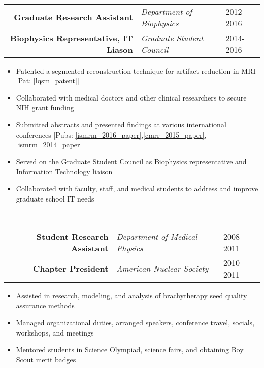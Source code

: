 \\

\begin{minipage}{\textwidth}
	\begin{center}
		\begin{tabular}{rll}
			\textbf{Graduate Research Assistant} & \textit{Department of Biophysics} & 2012-2016 \\
			\textbf{Biophysics Representative, IT Liason} & \textit{Graduate Student Council} & 2014-2016 \\
		\end{tabular}
	\end{center}
\end{minipage}%

\begin{minipage}{\textwidth}
	\begin{itemize}
   	\item Patented a segmented reconstruction technique for artifact reduction in MRI [Pat: \ref{lqsm_patent}]
	\item Collaborated with medical doctors and other clinical researchers to secure NIH grant funding
	\item Submitted abstracts and presented findings at various international conferences [Pubs: \ref{ismrm_2016_paper},\ref{cmrr_2015_paper},\ref{ismrm_2014_paper}]
	\item Served on the Graduate Student Council as Biophysics representative and Information Technology liaison
	\item Collaborated with faculty, staff, and medical students to address and improve graduate school IT needs
	\end{itemize}
\end{minipage}

\\

\begin{minipage}{\textwidth}
	\begin{center}
		\begin{tabular}{rll}
			\textbf{Student Research Assistant} & \textit{Department of Medical Physics} & 2008-2011 \\
			\textbf{Chapter President} & \textit{American Nuclear Society} & 2010-2011 \\
		\end{tabular}
	\end{center}
\end{minipage}%

\begin{minipage}{\textwidth}
	\begin{itemize}
		\item Assisted in research, modeling, and analysis of brachytherapy seed quality assurance methods
		\item Managed organizational duties, arranged speakers, conference travel, socials, workshops, and meetings
		\item Mentored students in Science Olympiad, science fairs, and obtaining Boy Scout merit badges
	\end{itemize}
\end{minipage}
